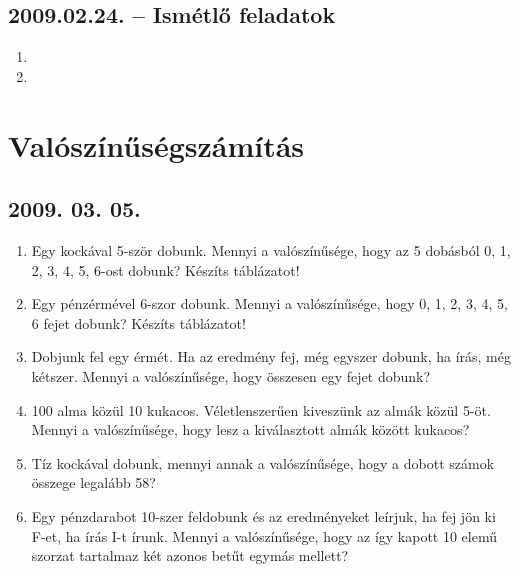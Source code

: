 \subsection*{2009.02.24. -- Ismétlő feladatok}
\begin{enumerate}
\item 

\item 
{}

\end{enumerate}


\section{Valószínűségszámítás}

\subsection*{2009. 03. 05.}
\begin{enumerate}
\item Egy kockával 5-ször dobunk. Mennyi a valószínűsége, hogy az 5 dobásból 0, 1, 2, 3, 4, 5, 6-ost dobunk? Készíts táblázatot!

\item Egy pénzérmével 6-szor dobunk. Mennyi a valószínűsége, hogy 0, 1, 2, 3, 4, 5, 6 fejet dobunk? Készíts táblázatot!

\item Dobjunk fel egy érmét. Ha az eredmény fej, még egyszer dobunk, ha írás, még kétszer. Mennyi a valószínűsége, hogy összesen egy fejet dobunk?

\item 100 alma közül 10 kukacos. Véletlenszerűen kiveszünk az almák közül 5-öt. Mennyi a valószínűsége, hogy lesz a kiválasztott almák között kukacos?

\item Tíz kockával dobunk, mennyi annak a valószínűsége, hogy a dobott számok összege legalább 58?

\item Egy pénzdarabot 10-szer feldobunk és az eredményeket leírjuk, ha fej jön ki F-et, ha írás I-t írunk. Mennyi a valószínűsége, hogy az így kapott 10 elemű szorzat tartalmaz két azonos betűt egymás mellett?
\end{enumerate}
